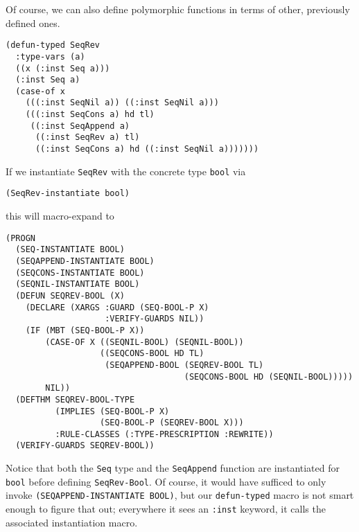 \documentclass[]{eptcs}
\begin{document}
Of course, we can also define polymorphic functions in terms of other, previously defined ones.
\begin{verbatim}
(defun-typed SeqRev
  :type-vars (a)
  ((x (:inst Seq a)))
  (:inst Seq a)
  (case-of x
    (((:inst SeqNil a)) ((:inst SeqNil a)))
    (((:inst SeqCons a) hd tl) 
     ((:inst SeqAppend a) 
      ((:inst SeqRev a) tl) 
      ((:inst SeqCons a) hd ((:inst SeqNil a)))))))
\end{verbatim}
If we instantiate \verb|SeqRev| with the concrete type \verb|bool| via
\begin{verbatim}
(SeqRev-instantiate bool)
\end{verbatim}
this will macro-expand to
\begin{verbatim}
(PROGN
  (SEQ-INSTANTIATE BOOL)
  (SEQAPPEND-INSTANTIATE BOOL)
  (SEQCONS-INSTANTIATE BOOL)
  (SEQNIL-INSTANTIATE BOOL)
  (DEFUN SEQREV-BOOL (X)
    (DECLARE (XARGS :GUARD (SEQ-BOOL-P X)
                    :VERIFY-GUARDS NIL))
    (IF (MBT (SEQ-BOOL-P X))
        (CASE-OF X ((SEQNIL-BOOL) (SEQNIL-BOOL))
                   ((SEQCONS-BOOL HD TL)
                    (SEQAPPEND-BOOL (SEQREV-BOOL TL)
                                    (SEQCONS-BOOL HD (SEQNIL-BOOL)))))
        NIL))
  (DEFTHM SEQREV-BOOL-TYPE
          (IMPLIES (SEQ-BOOL-P X)
                   (SEQ-BOOL-P (SEQREV-BOOL X)))
          :RULE-CLASSES (:TYPE-PRESCRIPTION :REWRITE))
  (VERIFY-GUARDS SEQREV-BOOL))
\end{verbatim}
Notice that both the \verb|Seq| type and the \verb|SeqAppend| function are instantiated for \verb|bool| before defining \verb|SeqRev-Bool|. Of course, it would have sufficed to only invoke \verb|(SEQAPPEND-INSTANTIATE BOOL)|, but our \verb|defun-typed| macro is not smart enough to figure that out; everywhere it sees an \verb|:inst| keyword, it calls the associated instantiation macro.
\end{document}
